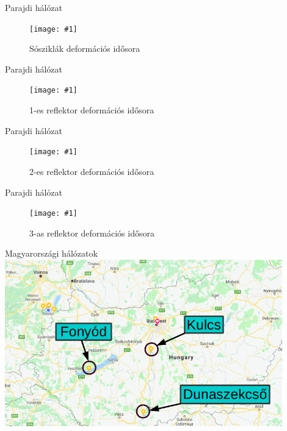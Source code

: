 \documentclass{beamer}
\newcommand\figu[3]{
    \begin{figure}
        \texttt{[image: \#1]}
        \caption{#3}
    \end{figure}
}
\begin{document}
\begin{frame}{Parajdi hálózat}
\figu{parajd_ts1.png}{0.9}{Sósziklák deformációs idősora}
\end{frame}

\begin{frame}{Parajdi hálózat}
\figu{parajd_ts2.png}{0.9}{1-es reflektor deformációs idősora}
\end{frame}

\begin{frame}{Parajdi hálózat}
\figu{parajd_ts3.png}{0.9}{2-es reflektor deformációs idősora}
\end{frame}

\begin{frame}{Parajdi hálózat}
\figu{parajd_ts4.png}{0.9}{3-as reflektor deformációs idősora}
\end{frame}


\begin{frame}{Magyarországi hálózatok}
    \includegraphics[width=0.9\textwidth]{hungary_networks.png}
\end{frame}
\end{document}
